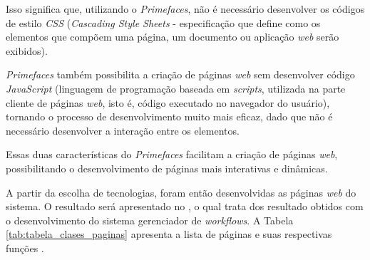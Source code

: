 Isso significa que, utilizando o \textit{Primefaces}, não é necessário desenvolver os códigos de estilo \textit{CSS} \cite{css_rfc} (\textit{Cascading Style Sheets} - especificação que define como os elementos que compõem uma página, um documento ou aplicação \textit{web} serão exibidos). 

\textit{Primefaces} também possibilita a criação de páginas \textit{web} sem desenvolver código \textit{JavaScript} \cite{js_rfc} (linguagem de programação baseada em \textit{scripts}, utilizada na parte cliente de páginas \textit{web}, isto é, código executado no navegador do usuário), tornando o processo de desenvolvimento muito mais eficaz, dado que não é necessário desenvolver a interação entre os elementos. 

Essas duas características do \textit{Primefaces} facilitam a criação de páginas \textit{web}, possibilitando o desenvolvimento de páginas mais interativas e dinâmicas.

A partir da escolha de tecnologias, foram então desenvolvidas as páginas \textit{web} do sistema. O resultado será apresentado no , o qual trata dos resultado obtidos com o desenvolvimento do sistema gerenciador de \textit{workflows}. A Tabela \ref{tab:tabela_clases_paginas} apresenta a lista de páginas e suas respectivas funções .

\begin{table}[H]
\centering
{}
\caption{Relação entre classes Java e páginas \textit{HTML}.}
\label{tab:tabela_clases_paginas}
\end{table}

